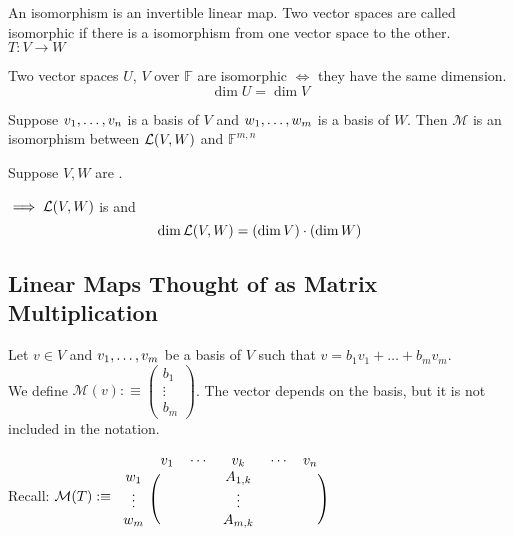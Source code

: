   \begin{thm}
    An isomorphism is an invertible linear map. Two vector spaces are called isomorphic if there is a isomorphism from one vector space to the other. $T:V\to W$
  \end{thm}

  \begin{thm}
    Two \fd vector spaces $U$, $V$ over $\mathbb{F}$ are isomorphic $\iff$ they have the same dimension. 
    \begin{equation}
      \dim U = \dim V
    \end{equation}
  \end{thm}

  \begin{thm}
    Suppose $v_1, \dots, v_n$ is a basis of $V$ and $w_1, \dots, w_m$ is a basis of $W$. Then $\mathcal{M}$ is an isomorphism between ${\mathcal{L}(V,W)}$ and $\mathbb{F}^{m,n}$
  \end{thm}

  \begin{thm}
    Suppose $V,W$ are \fd.
    
    $\implies {\mathcal{L}(V,W)}$ is \fd and
    \begin{equation}
      \dim {\mathcal{L}(V,W)} = (\dim V)\cdot(\dim W)
    \end{equation}
  \end{thm}

  \subsection{Linear Maps Thought of as Matrix Multiplication}

  \begin{mydef}
    Let $v \in V$ and $v_1, \dots, v_m$ be a basis of $V$ such that $v=b_1v_1+\dots+b_mv_m$.
    \\
    We define
    $
    \mathcal{M}(v) :\equiv
    \left (
    \begin{matrix}
      b_1 \\ \vdots \\ b_m
    \end{matrix}
    \right )
    $. The vector depends on the basis, but it is not included in the notation.
  \end{mydef}

  Recall: $
  \mathcal{M} (T) :\equiv
  \begin{blockarray}{cccc}
    & v_1 \quad \cdots & v_k & \cdots \quad v_n \\
    \begin{block}{c(ccc)}
      w_1    & & A_{1,k} & \\
      \vdots & & \vdots & \\
      w_m    & & A_{m,k} & \\
    \end{block}
  \end{blockarray}
  $


